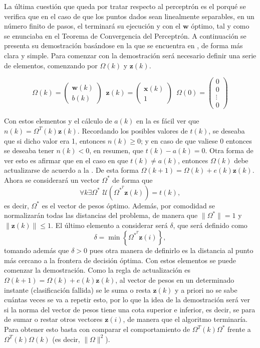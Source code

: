 		La última cuestión que queda por tratar respecto al perceptrón es el porqué se verifica que en el caso de que los puntos dados sean linealmente separables, en un número finito de pasos, el  terminará su ejecución y con el $\textbf{w}$ óptimo, tal y como se enunciaba en el Teorema de Convergencia del Perceptrón. A continuación se presenta su demostración basándose en la que se encuentra en \cite{nndesign}, de forma más clara y simple. Para comenzar con la demostración será necesario definir una serie de elementos, comenzando por $\Omega(k)$ y $\textbf{z}(k)$.  
		
		$$
		\Omega(k) = \left(\begin{array}{c}
			\textbf{w}(k)\\\hline
			b(k)
		\end{array}\right) \,\,\, \textbf{z}(k) = \left(\begin{array}{c}
		\textbf{x}(k)\\\hline
		1
		\end{array}\right)
		 \,\,\, \Omega(0) = \begin{pmatrix}
			0\\0\\\vdots\\0
		\end{pmatrix}
		$$
		
		Con estos elementos y el cálculo de $a(k)$ en la  es fácil ver que $n(k) = \Omega^T(k)\textbf{z}(k)$. Recordando los posibles valores de $t(k)$, se deseaba que si dicho valor era 1, entonces $n(k) \geq 0$; y en caso de que valiese 0 entonces se deseaba tener $n(k) < 0$, en resumen, que $t(k) - a(k) = 0$. Otra forma de ver esto es afirmar que en el caso en que $t(k) \neq a(k)$, entonces $\Omega(k)$ debe actualizarse de acuerdo a la . De esta forma $\Omega(k + 1) = \Omega(k) + e(k)\textbf{z}(k)$. Ahora se considerará un vector $\Omega^*$ de forma que 
		$$
		\forall k \exists \Omega^* \,\, \mathcal{U}\left(\Omega^{*^T}\textbf{z}(k)\right) = t(k),
		$$
		es decir, $\Omega^*$ es el vector de pesos óptimo. Además, por comodidad se normalizarán todas las distancias del problema, de manera que $\|\Omega^{*}\| = 1$ y $\|\textbf{z}(k)\| \leq 1$. El último elemento a considerar será $\delta$, que será definido como
		$$
		\delta = \min\left\lbrace\Omega^{*^T}\textbf{z}(i)\right\rbrace, 
		$$
		tomando además que $\delta > 0$ pues otra manera de definirlo es la distancia al punto más cercano a la frontera de decisión óptima. Con estos elementos se puede comenzar la demostración. Como la regla de actualización es $\Omega(k + 1) = \Omega(k) + e(k)\textbf{z}(k)$, al vector de pesos en un determinado instante (clasificación fallida) se le suma o resta $\textbf{z}(k)$ y a priori no se sabe cuántas veces se va a repetir esto, por lo que la idea de la demostración será ver si la norma del vector de pesos tiene una cota superior e inferior, es decir, se para de sumar o restar otros vectores $\textbf{z}(i)$, de manera que el algoritmo terminaría. Para obtener esto basta con comparar el comportamiento de $\Omega^T(k) \Omega^*$ frente a $\Omega^T(k)\Omega(k)$ (es decir, $\|\Omega\|^2$). \\
		
